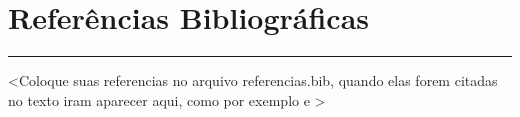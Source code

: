 \renewcommand{\bibname}{}

\renewcommand{\refname}{}

\section{Referências Bibliográficas}

\vspace{-0.4cm}

\noindent\rule{\textwidth}{0.7pt}

<Coloque suas referencias no arquivo referencias.bib, quando elas forem citadas no texto iram aparecer aqui, como por exemplo \cite{silva2024} e \cite{knuth1984}>

\vspace{-0.8cm}

